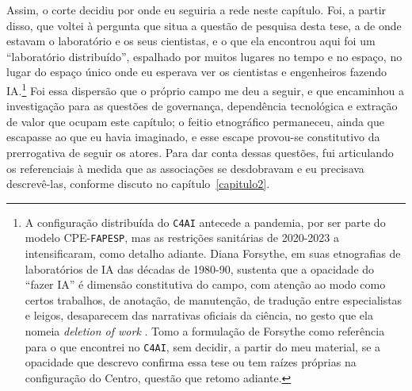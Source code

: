 Assim, o corte decidiu por onde eu seguiria a rede neste capítulo. Foi, a partir disso, que voltei à pergunta que situa a questão de pesquisa desta tese, a de onde estavam o laboratório e os seus cientistas, e o que ela encontrou aqui foi um \enquote{laboratório distribuído}, espalhado por muitos lugares no tempo e no espaço, no lugar do espaço único onde eu esperava ver os cientistas e engenheiros fazendo IA.\footnote{A configuração distribuída do \texttt{C4AI} antecede a pandemia, por ser parte do modelo CPE-\texttt{FAPESP}, mas as restrições sanitárias de 2020-2023 a intensificaram, como detalho adiante. Diana Forsythe, em suas etnografias de laboratórios de IA das décadas de 1980-90, sustenta que a opacidade do \enquote{fazer IA} é dimensão constitutiva do campo, com atenção ao modo como certos trabalhos, de anotação, de manutenção, de tradução entre especialistas e leigos, desaparecem das narrativas oficiais da ciência, no gesto que ela nomeia \textit{deletion of work} \parencite{Forsythe2001}. Tomo a formulação de Forsythe como referência para o que encontrei no \texttt{C4AI}, sem decidir, a partir do meu material, se a opacidade que descrevo confirma essa tese ou tem raízes próprias na configuração do Centro, questão que retomo adiante.} Foi essa dispersão que o próprio campo me deu a seguir, e que encaminhou a investigação para as questões de governança, dependência tecnológica e extração de valor que ocupam este capítulo; o feitio etnográfico permaneceu, ainda que escapasse ao que eu havia imaginado, e esse escape provou-se constitutivo da prerrogativa de seguir os atores. Para dar conta dessas questões, fui articulando os referenciais à medida que as associações se desdobravam e eu precisava descrevê-las, conforme discuto no capítulo~\ref{capitulo2}.

